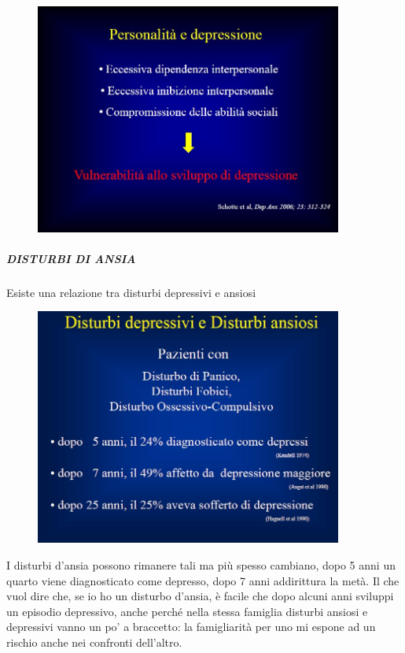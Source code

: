 \begin{figure}[!ht]
\centering
	\includegraphics[width=0.9\textwidth]{02/image7.jpeg}
\end{figure}


\subparagraph{DISTURBI DI ANSIA}
Esiste una relazione tra disturbi depressivi e ansiosi

\begin{figure}[!ht]
\centering
	\includegraphics[width=0.9\textwidth]{02/image8.jpeg}
\end{figure}

I disturbi d'ansia possono rimanere tali ma più spesso cambiano, dopo 5
anni un quarto viene diagnosticato come depresso, dopo 7 anni
addirittura la metà. Il che vuol dire che, se io ho un disturbo d'ansia,
è facile che dopo alcuni anni sviluppi un episodio depressivo, anche
perché nella stessa famiglia disturbi ansiosi e depressivi vanno un po'
a braccetto: la famigliarità per uno mi espone ad un rischio anche nei
confronti dell'altro.


